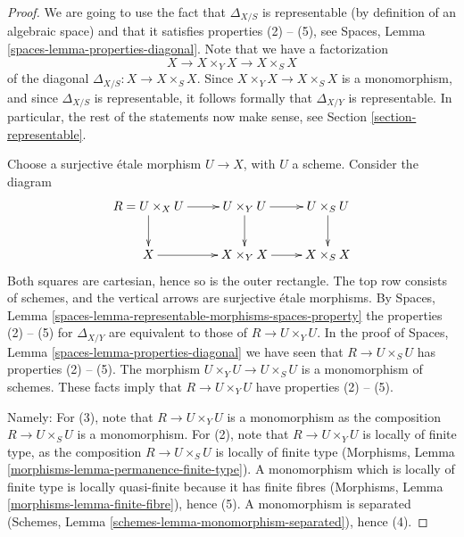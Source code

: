 \documentclass[10pt,a4paper]{amsart}
\theoremstyle{plain}
\theoremstyle{definition}
\theoremstyle{remark}
\numberwithin{equation}{subsection}
\begin{document}
\begin{proof}
We are going to use the fact that $\Delta_{X/S}$ is
representable (by definition of an algebraic space) and that
it satisfies properties (2) -- (5), see
Spaces, Lemma \ref{spaces-lemma-properties-diagonal}.
Note that we have a factorization
$$
X
\longrightarrow
X \times_Y X
\longrightarrow
X \times_S X
$$
of the diagonal $\Delta_{X/S} : X \to X \times_S X$. Since
$X \times_Y X \to X \times_S X$ is a monomorphism, and since
$\Delta_{X/S}$ is representable, it follows formally that
$\Delta_{X/Y}$ is representable. In particular, the rest of
the statements now make sense, see
Section \ref{section-representable}.

\medskip\noindent
Choose a surjective \'etale morphism $U \to X$, with $U$ a scheme.
Consider the diagram
$$
\xymatrix{
R = U \times_X U \ar[r] \ar[d] &
U \times_Y U \ar[d] \ar[r] &
U \times_S U \ar[d] \\
X \ar[r] & X \times_Y X \ar[r] & X \times_S X
}
$$
Both squares are cartesian, hence so is the outer rectangle.
The top row consists of schemes, and the vertical arrows
are surjective \'etale morphisms. By
Spaces, Lemma \ref{spaces-lemma-representable-morphisms-spaces-property}
the properties (2) -- (5) for $\Delta_{X/Y}$ are equivalent to those of
$R \to U \times_Y U$. In the proof of
Spaces, Lemma \ref{spaces-lemma-properties-diagonal}
we have seen that $R \to U \times_S U$ has properties (2) -- (5).
The morphism $U \times_Y U \to U \times_S U$ is a monomorphism
of schemes. These facts imply that $R \to U \times_Y U$ have
properties (2) -- (5).

\medskip\noindent
Namely: For (3), note that $R \to U \times_Y U$
is a monomorphism as the composition
$R \to U \times_S U$ is a monomorphism. For (2), note that
$R \to U \times_Y U$ is locally of finite type, as the
composition $R \to U \times_S U$ is locally of finite type
(Morphisms, Lemma \ref{morphisms-lemma-permanence-finite-type}).
A monomorphism which is locally of finite type is locally quasi-finite
because it has finite fibres
(Morphisms, Lemma \ref{morphisms-lemma-finite-fibre}), hence (5).
A monomorphism is separated
(Schemes, Lemma \ref{schemes-lemma-monomorphism-separated}), hence (4).
\end{proof}
\end{document}
